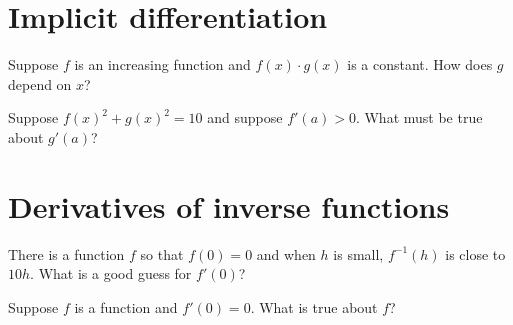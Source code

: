 \documentclass{ximera}
\begin{document}
\clearpage

\section{Implicit differentiation}

\begin{problem}
  Suppose $f$ is an increasing function and $f(x) \cdot g(x)$ is a constant.  How does $g$ depend on $x$?
  \begin{multipleChoice}
  \end{multipleChoice}
\end{problem}

\begin{problem}
  Suppose $f(x)^2 + g(x)^2 = 10$ and suppose $f'(a) > 0$.  What must be true about $g'(a)$?
  \begin{multipleChoice}
  \end{multipleChoice}
\end{problem}

\clearpage

\section{Derivatives of inverse functions}

\begin{problem}
  There is a function $f$ so that $f(0) = 0$ and when $h$ is small, $f^{-1}(h)$ is close to $10 h$.  What is a good guess for $f'(0)$?
  \begin{multipleChoice}
  \end{multipleChoice}
\end{problem}

\begin{problem}
  Suppose $f$ is a function and $f'(0) = 0$.  What is true about $f$?
  \begin{multipleChoice}
  \end{multipleChoice}
\end{problem}

\clearpage
\end{document}
